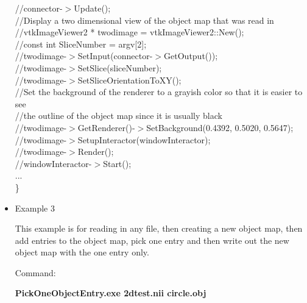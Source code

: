 \documentclass{InsightArticle}
\begin{document}
\begin{itemize}
{		//connector-$>$Update();\\
		
		//Display a two dimensional view of the object map that was read in\\
		//vtkImageViewer2 * twodimage = vtkImageViewer2::New();\\
		
		//const int SliceNumber = argv[2];\\
		//twodimage-$>$SetInput(connector-$>$GetOutput());\\
		//twodimage-$>$SetSlice(sliceNumber);\\
		//twodimage-$>$SetSliceOrientationToXY();\\
		
		//Set the background of the renderer to a grayish color so that it is easier to see\\
		//the outline of the object map since it is usually black\\
		//twodimage-$>$GetRenderer()-$>$SetBackground(0.4392, 0.5020, 0.5647);\\
		
		
		//twodimage-$>$SetupInteractor(windowInteractor);\\
		
		//twodimage-$>$Render();\\
		//windowInteractor-$>$Start();\\
		...\\
\}
}
                                                                               
\item Example 3

This example is for reading in any file, then creating a new object map, then add entries to the object map, pick one entry and then write out the new object map with the one entry only.

Command:

\textbf{PickOneObjectEntry.exe 2dtest.nii circle.obj}

\end{itemize}
\end{document}
